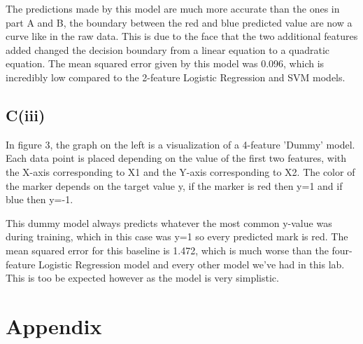 \documentclass{article}
\begin{document}
The predictions made by this model are much more accurate than the ones in part A and B, the boundary between the red and blue predicted value are now a curve like in the raw data. This is due to the face that the two additional features added changed the decision boundary from a linear equation to a quadratic equation. The mean squared error given by this model was 0.096, which is incredibly low compared to the 2-feature Logistic Regression and SVM models.

\subsection{C(iii)}
In figure 3, the graph on the left is a visualization of a 4-feature 'Dummy' model. Each data point is placed depending on the value of the first two features, with the X-axis corresponding to X1 and the Y-axis corresponding to X2. The color of the marker depends on the target value y, if the marker is red then y=1 and if blue then y=-1.

This dummy model always predicts whatever the most common y-value was during training, which in this case was y=1 so every predicted mark is red. The mean squared error for this baseline is 1.472, which is much worse than the four-feature Logistic Regression model and every other model we've had in this lab. This is too be expected however as the model is very simplistic.

\section{Appendix}

\end{document}
